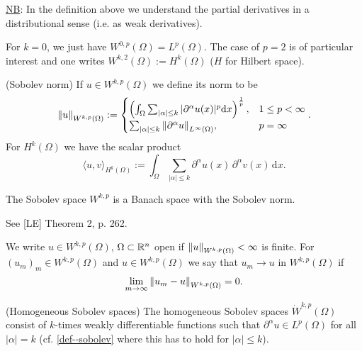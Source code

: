 \documentclass[11pt]{article}
\begin{document}
		\noindent\underline{NB}: In the definition above we understand the partial derivatives in a distributional sense (i.e. as weak derivatives).
		
		\begin{remark}
			For $k=0$, we just have $W^{0,p}(\Omega)=L^p(\Omega)$. The case of $p=2$ is of particular interest and one writes $W^{k,2}(\Omega):=H^k(\Omega)$ ($H$ for Hilbert space).
		\end{remark}

		\begin{defi}
			(Sobolev norm) If $u\in W^{k,p}(\Omega)$ we define its norm to be
			\begin{equation*}
				\norm{u}_{W^{k,p}(\Omega)}:=
				\begin{cases}
					\left(\int_{\Omega}\sum_{|\alpha|\le k}|\partial^\alpha u(x)|^p \mathrm{d}x\right)^{\frac{1}{p}}, & 1\le p<\infty\\
					\sum_{|\alpha|\le k}\norm{\partial^\alpha u}_{L^\infty(\Omega)}, & p=\infty
				\end{cases}.
			\end{equation*}
			For $H^k(\Omega)$ we have the scalar product
			\begin{equation*}
				\langle u,v\rangle_{H^k(\Omega)}:=\int_\Omega\sum_{|\alpha|\le k}\partial^\alpha u(x)\,\partial^\alpha v(x)\, \mathrm{d}x.
			\end{equation*}
		\end{defi}

		\begin{prop}
			The Sobolev space $W^{k,p}$ is a Banach space with the Sobolev norm.
		\end{prop}
		\begin{pproof}
			See [LE] Theorem 2, p. 262.
		\end{pproof}

		\begin{defi}
			We write $u\in W^{k,p}(\Omega)$, $\Omega\subset\mathbb{R}^n$ open if $\norm{u}_{W^{k,p}(\Omega)}<\infty$ is finite. For $(u_m)_m\in W^{k,p}(\Omega)$ and $u\in W^{k,p}(\Omega)$ we say that $u_m\to u$ in $W^{k,p}(\Omega)$ if 
			\begin{equation*}
				\lim_{m\to\infty}\norm{u_m-u}_{W^{k,p}(\Omega)}=0.
			\end{equation*}
		\end{defi}

		\begin{defi}
			(Homogeneous Sobolev spaces) The homogeneous Sobolev spaces $\dot{W}^{k,p}(\Omega)$ consist of $k$-times weakly differentiable functions such that $\partial^\alpha u\in L^p(\Omega)$ for all $|\alpha|=k$ (cf. \autoref{def--sobolev} where this has to hold for $|\alpha|\le k$).
		\end{defi}
\end{document}
